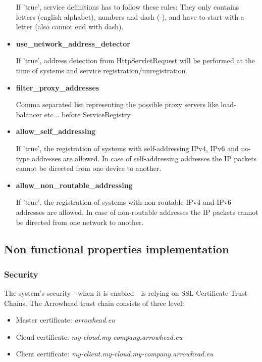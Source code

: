 \documentclass[a4paper]{arrowhead}
\begin{document}
\begin{itemize}
    If 'true', service definitions has to follow these rules: They only contains letters (english alphabet), numbers and dash (-), and have to start with a letter (also cannot end with dash).
    
    \item \textbf{use\_network\_address\_detector}
  
    If 'true', address detection from HttpServletRequest will be performed at the time of systems and service registration/unregistration.
    
    \item \textbf{filter\_proxy\_addresses}
  
    Comma separated list representing the possible proxy servers like load-balancer etc... before ServiceRegistry.
    
    \item \textbf{allow\_self\_addressing}
  
    If 'true', the registration of systems with self-addressing IPv4, IPv6 and no-type addresses are allowed. In case of self-addressing addresses the IP packets cannot be directed from one device to another.
    
    \item \textbf{allow\_non\_routable\_addressing}
  
    If 'true', the registration of systems with non-routable IPv4 and IPv6 addresses are allowed. In case of non-routable addresses the IP packets cannot be directed from one network to another.
\end{itemize}

\subsection {Non functional properties implementation}

\subsubsection {Security}

The system's security - when it is enabled - is relying on SSL Certificate Trust Chains. The Arrowhead trust chain consists of three level:

\begin{itemize}
    \item Master certificate: \textit{arrowhead.eu}
    \item Cloud certificate: \textit{my-cloud.my-company.arrowhead.eu}
    \item Client certificate: \textit{my-client.my-cloud.my-company.arrowhead.eu}
\end{itemize}
\end{document}
